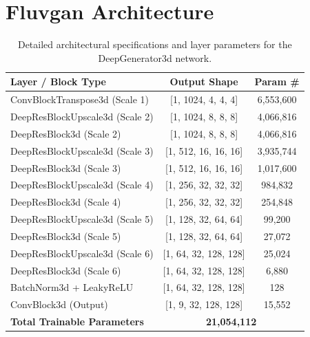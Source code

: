 \section{Fluvgan Architecture}\label{Appendix:FluvGAN_Architecture}
\begin{table}[htbp]
    \centering
    \renewcommand{\arraystretch}{1.2}
    \begin{tabular}{p{}cc}
        \hline
        \textbf{Layer / Block Type} & \textbf{Output Shape} & \textbf{Param \#} \\
        \hline
        ConvBlockTranspose3d (Scale 1) & [1, 1024, 4, 4, 4] & 6,553,600 \\
        DeepResBlockUpscale3d (Scale 2) & [1, 1024, 8, 8, 8] & 4,066,816 \\
        DeepResBlock3d (Scale 2) & [1, 1024, 8, 8, 8] & 4,066,816 \\
        DeepResBlockUpscale3d (Scale 3) & [1, 512, 16, 16, 16] & 3,935,744 \\
        DeepResBlock3d (Scale 3) & [1, 512, 16, 16, 16] & 1,017,600 \\
        DeepResBlockUpscale3d (Scale 4) & [1, 256, 32, 32, 32] & 984,832 \\
        DeepResBlock3d (Scale 4) & [1, 256, 32, 32, 32] & 254,848 \\
        DeepResBlockUpscale3d (Scale 5) & [1, 128, 32, 64, 64] & 99,200 \\
        DeepResBlock3d (Scale 5) & [1, 128, 32, 64, 64] & 27,072 \\
        DeepResBlockUpscale3d (Scale 6) & [1, 64, 32, 128, 128] & 25,024 \\
        DeepResBlock3d (Scale 6) & [1, 64, 32, 128, 128] & 6,880 \\
        BatchNorm3d + LeakyReLU & [1, 64, 32, 128, 128] & 128 \\
        ConvBlock3d (Output) & [1, 9, 32, 128, 128] & 15,552 \\
        \hline
        \textbf{Total Trainable Parameters} & \multicolumn{2}{c}{\textbf{21,054,112}} \\
        \hline
    \end{tabular}
    \caption{Detailed architectural specifications and layer parameters for the DeepGenerator3d network.}
    \label{tab:best_generator_architecture}
\end{table}

